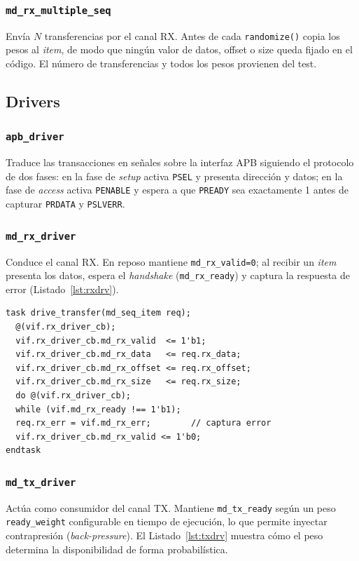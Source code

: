 \documentclass[conference]{IEEEtran}
\begin{document}
\subsubsection{\texttt{md\_rx\_multiple\_seq}}
Envía $N$ transferencias por el canal RX. Antes de cada \texttt{randomize()}
copia los pesos al \textit{item}, de modo que ningún valor de datos, offset o
size queda fijado en el código. El número de transferencias y todos los pesos
provienen del test.

\subsection{Drivers}
\subsubsection{\texttt{apb\_driver}}
Traduce las transacciones en señales sobre la interfaz APB siguiendo el
protocolo de dos fases: en la fase de \textit{setup} activa \texttt{PSEL} y
presenta dirección y datos; en la fase de \textit{access} activa \texttt{PENABLE}
y espera a que \texttt{PREADY} sea exactamente 1 antes de capturar
\texttt{PRDATA} y \texttt{PSLVERR}.

\subsubsection{\texttt{md\_rx\_driver}}
Conduce el canal RX. En reposo mantiene \texttt{md\_rx\_valid=0}; al recibir un
\textit{item} presenta los datos, espera el \textit{handshake}
(\texttt{md\_rx\_ready}) y captura la respuesta de error
(Listado~\ref{lst:rxdrv}).

\begin{lstlisting}[caption={Conducción de una transferencia RX},label={lst:rxdrv}]
task drive_transfer(md_seq_item req);
  @(vif.rx_driver_cb);
  vif.rx_driver_cb.md_rx_valid  <= 1'b1;
  vif.rx_driver_cb.md_rx_data   <= req.rx_data;
  vif.rx_driver_cb.md_rx_offset <= req.rx_offset;
  vif.rx_driver_cb.md_rx_size   <= req.rx_size;
  do @(vif.rx_driver_cb);
  while (vif.md_rx_ready !== 1'b1);
  req.rx_err = vif.md_rx_err;        // captura error
  vif.rx_driver_cb.md_rx_valid <= 1'b0;
endtask
\end{lstlisting}

\subsubsection{\texttt{md\_tx\_driver}}
Actúa como consumidor del canal TX. Mantiene \texttt{md\_tx\_ready} según un peso
\texttt{ready\_weight} configurable en tiempo de ejecución, lo que permite
inyectar contrapresión (\textit{back-pressure}). El Listado~\ref{lst:txdrv}
muestra cómo el peso determina la disponibilidad de forma probabilística.
\end{document}
